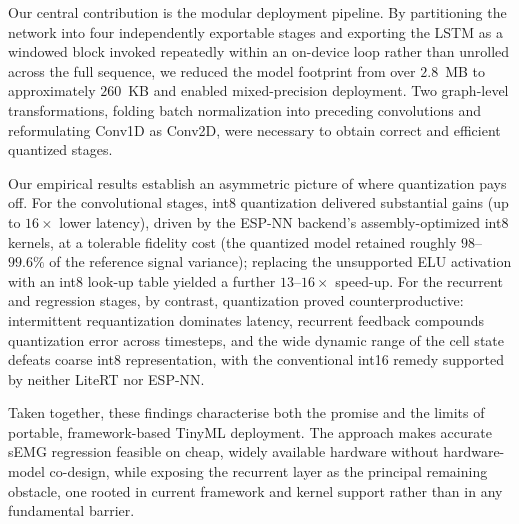 \documentclass[12pt,DIV16,BCOR12mm,a4paper,footinclude=false,headinclude,parskip=half-,twoside,openright,cleardoublepage=empty,toc=index,bibliography=totoc,listof=totoc]{scrreprt}
\def \doclang{english} 	%
\numberwithin{equation}{chapter}
\begin{document}
    Our central contribution is the modular deployment pipeline. By partitioning the network
    into four independently exportable stages and exporting the LSTM as a windowed block
    invoked repeatedly within an on-device loop rather than unrolled across the full sequence,
    we reduced the model footprint from over $2.8$~MB to approximately $260$~KB and enabled
    mixed-precision deployment. Two graph-level transformations, folding batch normalization
    into preceding convolutions and reformulating Conv1D as Conv2D, were necessary to obtain
    correct and efficient quantized stages.

    Our empirical results establish an asymmetric picture of where quantization pays off. For
    the convolutional stages, int8 quantization delivered substantial gains (up to $16\times$
    lower latency), driven by the ESP-NN backend's assembly-optimized int8 kernels, at a
    tolerable fidelity cost (the quantized model retained roughly $98$--$99.6\%$ of the
    reference signal variance); replacing the unsupported ELU activation with an int8 look-up
    table yielded a further $13$--$16\times$ speed-up. For the recurrent and regression stages,
    by contrast, quantization proved counterproductive: intermittent requantization dominates
    latency, recurrent feedback compounds quantization error across timesteps, and the wide
    dynamic range of the cell state defeats coarse int8 representation, with the conventional
    int16 remedy supported by neither LiteRT nor ESP-NN.

    Taken together, these findings characterise both the promise and the limits of portable,
    framework-based TinyML deployment. The approach makes accurate sEMG regression feasible on
    cheap, widely available hardware without hardware-model co-design, while exposing the
    recurrent layer as the principal remaining obstacle, one rooted in current framework and
    kernel support rather than in any fundamental barrier.

\listoffigures
\listoftables

\ifthenelse{\equal{\doclang}{german}}{
	
}{
	
}

\end{document}
